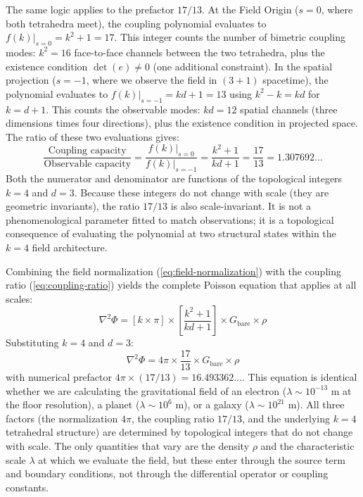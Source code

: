 \documentclass[aps,prd,preprint,superscriptaddress,showpacs,preprintnumbers,amsmath,amssymb,nofootinbib]{revtex4-2}
\begin{document}
The same logic applies to the prefactor $17/13$. At the Field Origin ($s=0$, where both tetrahedra meet), the coupling polynomial evaluates to $f(k)|_{s=0} = k^2 + 1 = 17$. This integer counts the number of bimetric coupling modes: $k^2 = 16$ face-to-face channels between the two tetrahedra, plus the existence condition $\det(e) \neq 0$ (one additional constraint). In the spatial projection ($s=-1$, where we observe the field in $(3+1)$ spacetime), the polynomial evaluates to $f(k)|_{s=-1} = kd+1 = 13$ using $k^2 - k = kd$ for $k = d+1$. This counts the observable modes: $kd = 12$ spatial channels (three dimensions times four directions), plus the existence condition in projected space. The ratio of these two evaluations gives:
\begin{equation}
\frac{\text{Coupling capacity}}{\text{Observable capacity}}
= \frac{f(k)|_{s=0}}{f(k)|_{s=-1}}
= \frac{k^2+1}{kd+1}
= \frac{17}{13}
= 1.307692\ldots
\label{eq:coupling-ratio}
\end{equation}
Both the numerator and denominator are functions of the topological integers $k=4$ and $d=3$. Because these integers do not change with scale (they are geometric invariants), the ratio $17/13$ is also scale-invariant. It is not a phenomenological parameter fitted to match observations; it is a topological consequence of evaluating the polynomial at two structural states within the $k=4$ field architecture.

Combining the field normalization (\ref{eq:field-normalization}) with the coupling ratio (\ref{eq:coupling-ratio}) yields the complete Poisson equation that applies at all scales:
\begin{equation}
\nabla^2\Phi = \left[k\times\pi\right] \times \left[\frac{k^2+1}{kd+1}\right] \times G_{\text{bare}} \times \rho
\label{eq:poisson-general}
\end{equation}
Substituting $k=4$ and $d=3$:
\begin{equation}
\nabla^2\Phi = 4\pi \times \frac{17}{13} \times G_{\text{bare}} \times \rho
\label{eq:poisson-numeric}
\end{equation}
with numerical prefactor $4\pi \times (17/13) = 16.493362\ldots$. This equation is identical whether we are calculating the gravitational field of an electron ($\lambda \sim 10^{-13}$ m at the floor resolution), a planet ($\lambda \sim 10^6$ m), or a galaxy ($\lambda \sim 10^{21}$ m). All three factors (the normalization $4\pi$, the coupling ratio $17/13$, and the underlying $k=4$ tetrahedral structure) are determined by topological integers that do not change with scale. The only quantities that vary are the density $\rho$ and the characteristic scale $\lambda$ at which we evaluate the field, but these enter through the source term and boundary conditions, not through the differential operator or coupling constants.
\end{document}
